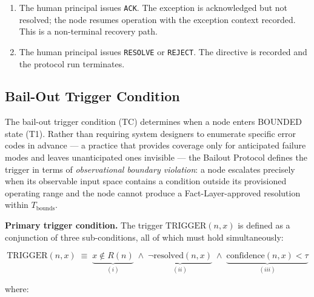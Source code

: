 \begin{enumerate}
\item[T8 --- HUMAN\_ACKNOWLEDGED $\rightarrow$ IDLE:] The human principal issues \texttt{ACK}. The exception is acknowledged but not resolved; the node resumes operation with the exception context recorded. This is a non-terminal recovery path.

\item[T9 --- HUMAN\_ACKNOWLEDGED $\rightarrow$ RESOLVED:] The human principal issues \texttt{RESOLVE} or \texttt{REJECT}. The directive is recorded and the protocol run terminates.
\end{enumerate}

\subsection{Bail-Out Trigger Condition}
\label{sec:bailout-trigger}

The bail-out trigger condition (TC) determines when a node enters BOUNDED state (T1). Rather than requiring system designers to enumerate specific error codes in advance --- a practice that provides coverage only for anticipated failure modes and leaves unanticipated ones invisible --- the Bailout Protocol defines the trigger in terms of \emph{observational boundary violation}: a node escalates precisely when its observable input space contains a condition outside its provisioned operating range and the node cannot produce a Fact-Layer-approved resolution within $T_{\text{bounds}}$.

\bigskip
\noindent\textbf{Primary trigger condition.} The trigger $\text{TRIGGER}(n, x)$ is defined as a conjunction of three sub-conditions, all of which must hold simultaneously:

\begin{equation}
\text{TRIGGER}(n, x) \;\equiv\; \underbrace{x \notin R(n)}_{(i)} \;\land\; \underbrace{\neg\text{resolved}(n, x)}_{(ii)} \;\land\; \underbrace{\text{confidence}(n, x) < \tau}_{(iii)} \tag{TC}
\end{equation}

where:

